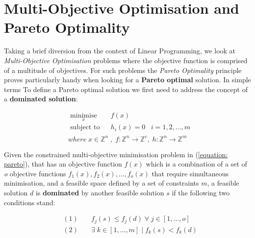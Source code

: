 
\section{Multi-Objective Optimisation and Pareto Optimality}
\label{section: Pareto}
Taking a brief diversion from the context of Linear Programming, we look at \textit{Multi-Objective Optimisation} problems where the objective function is comprised of a multitude of objectives. For such problems the \textit{Pareto Optimality} principle proves particularly handy when looking for a \textbf{Pareto optimal} solution. In simple terms To define a Pareto optimal solution we first need to address the concept of a \textbf{dominated solution}: 

\begin{equation}
\begin{aligned}
\label{equation: pareto}
& \underset{x}{\text{minimise}}
& & f(x) \\
& \text{subject to}
& & h_i(x) = 0 \;\;\; i = 1,2, \ldots, m\\
\end{aligned}
\end{equation}
\[where \; x \in \mathbb{Z}^{n} \;, \; f:\mathbb{Z}^{n}\rightarrow \mathbb{Z}^{c}, \; h:\mathbb{Z}^{n}\rightarrow \mathbb{Z}^{m} \]

\vspace{\baselineskip}
\noindent
Given the constrained multi-objective minimisation problem in (\ref{equation: pareto}), that has an objective function $f(x)$ which is a combination of a set of \textit{o} objective functions $f_{1}(x),f_{2}(x),\ldots,f_{o}(x)$ that require simultaneous minimisation, and a feasible space defined by a set of constraints $m$, a feasible solution $d$ is \textbf{dominated} by another feasible solution $s$ if the following two conditions stand:


\begin{equation*}
\begin{aligned}
&(1) \; & &f_{j}(s) \leq f_{j}(d) \; \forall \; j \in [1,\dots,o] \\
&(2) \; & &\exists \; k \in [1,\dots,m] \; | \; f_{k}(s) < f_{k}(d) \\ 
\end{aligned}
\end{equation*}


